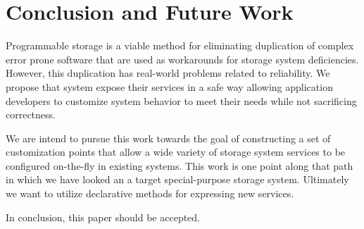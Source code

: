 \documentclass[10pt,twocolumn]{article}
\begin{document}
\section{Conclusion and Future Work}\label{conclusion-and-future-work}

Programmable storage is a viable method for eliminating duplication of
complex error prone software that are used as workarounds for storage
system deficiencies. However, this duplication has real-world problems
related to reliability. We propose that system expose their services in
a safe way allowing application developers to customize system behavior
to meet their needs while not sacrificing correctness.

We are intend to pursue this work towards the goal of constructing a set
of customization points that allow a wide variety of storage system
services to be configured on-the-fly in existing systems. This work is
one point along that path in which we have looked an a target
special-purpose storage system. Ultimately we want to utilize
declarative methods for expressing new services.

In conclusion, this paper should be accepted.



\end{document}
